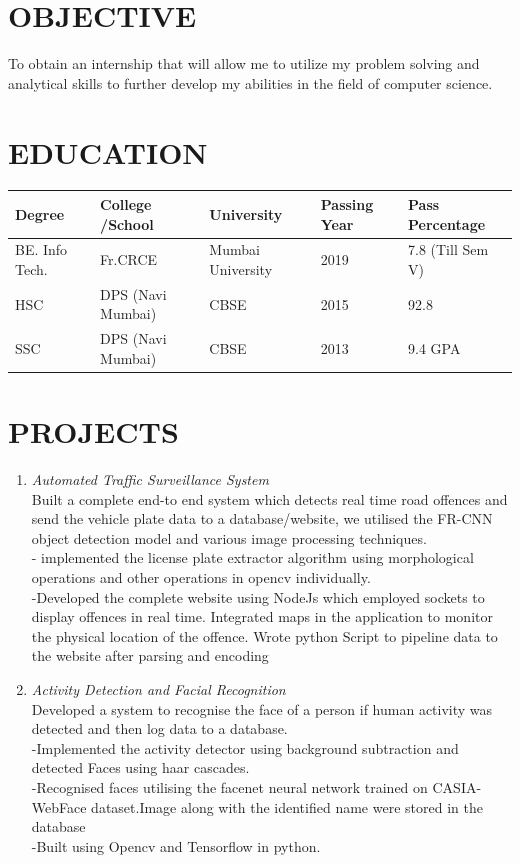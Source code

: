 \documentclass[margin]{res}
\begin{document}
\begin{resume}
 
 \section{OBJECTIVE} To obtain an internship that will allow me to utilize my problem solving and analytical skills to further develop my abilities in the field of computer science.\\

\section{EDUCATION}\begin{tabu} to 1\textwidth { | X[c] | X[c] | X[c] | X[c]| X[c]|}
 \hline
 Degree & College /School & University & Passing Year & Pass Percentage\\
 \hline
 BE. Info Tech. & Fr.CRCE &Mumbai University & 2019 & 7.8 (Till Sem V) \\
\hline
HSC & DPS (Navi Mumbai)& CBSE & 2015 & 92.8\\
\hline
SSC & DPS (Navi Mumbai) & CBSE & 2013 & 9.4 GPA\\
\hline
\end{tabu}

\section{PROJECTS } \begin{enumerate}
  \item  {\large{\sl Automated Traffic Surveillance System}}\\
 Built a complete end-to end system which detects real time road offences and send the vehicle plate data to a database/website, we utilised the FR-CNN object detection model and various image processing techniques.\\
        - implemented the license plate extractor algorithm using morphological operations and other operations in opencv individually.\\
        -Developed the complete website using NodeJs which employed sockets to display offences in real time. Integrated maps in the application to monitor the physical location of the offence. Wrote python Script to pipeline data to the website after parsing and encoding
 \item {\large{\sl Activity Detection and Facial Recognition}}\\
 Developed a system to recognise the face of a person if human activity was detected and then log data to a database.\\
  	-Implemented the activity detector using background subtraction and detected Faces using haar cascades.\\
	-Recognised faces utilising the facenet neural network trained on CASIA-WebFace dataset.Image along with the identified name were stored in the database\\
	-Built using Opencv and Tensorflow in python.\\
	\end{enumerate}


\end{resume}
\end{document}
